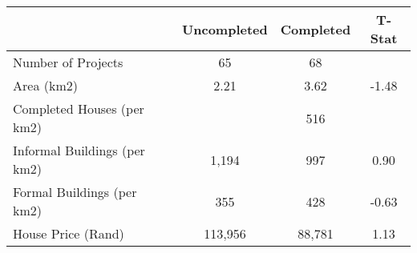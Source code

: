 \begin{tabular}{l*{1}{ccc}}
 &Uncompleted &Completed &T-Stat  \\
\hline 
Number of Projects &         65 &         68 &   \\
Area (km2) &       2.21 &       3.62 &      -1.48  \\
Completed Houses (per km2) &  &        516 &   \\
Informal Buildings (per km2) &      1,194 &        997 &       0.90  \\
Formal Buildings (per km2) &        355 &        428 &      -0.63  \\
House Price (Rand) &    113,956 &     88,781 &       1.13  \\
\hline
\end{tabular}